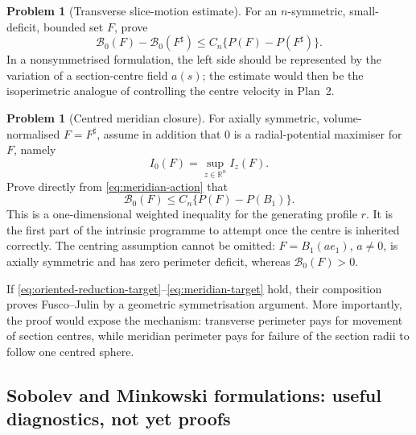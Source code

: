 \documentclass[11pt]{amsart}
\theoremstyle{definition}
\newtheorem{problem}[theorem]{Problem}
\newcommand{\R}{\mathbb R}
\newcommand{\Per}{P}
\begin{document}
\begin{problem}[Transverse slice-motion estimate]\label{prob:slice-motion}
For an \(n\)-symmetric, small-deficit, bounded set \(F\), prove
\[
   \mathcal B_0(F)-\mathcal B_0(F^\sharp)
      \le C_n\bigl\{\Per(F)-\Per(F^\sharp)\bigr\}.
\tag{6.8}\label{eq:slice-motion-target}
\]
In a nonsymmetrised formulation, the left side should be represented by
the variation of a section-centre field \(a(s)\); the estimate would
then be the isoperimetric analogue of controlling the centre velocity
in Plan~2.
\end{problem}

\begin{problem}[Centred meridian closure]\label{prob:meridian-closure}
For axially symmetric, volume-normalised \(F=F^\sharp\), assume in
addition that \(0\) is a radial-potential maximiser for \(F\), namely
\[
   I_0(F)=\sup_{z\in\R^n}I_z(F).
\]
Prove directly from \eqref{eq:meridian-action} that
\[
   \mathcal B_0(F)
      \le C_n\{\Per(F)-\Per(B_1)\}.
\tag{6.9}\label{eq:meridian-target}
\]
This is a one-dimensional weighted inequality for the generating
profile \(r\).  It is the first part of the intrinsic programme to
attempt once the centre is inherited correctly.  The centring
assumption cannot be omitted: \(F=B_1(ae_1)\), \(a\ne0\), is axially
symmetric and has zero perimeter deficit, whereas
\(\mathcal B_0(F)>0\).
\end{problem}

If \eqref{eq:oriented-reduction-target}--\eqref{eq:meridian-target}
hold, their composition proves Fusco--Julin by a geometric
symmetrisation argument.  More importantly, the proof would expose
the mechanism: transverse perimeter pays for movement of section
centres, while meridian perimeter pays for failure of the section
radii to follow one centred sphere.

\subsection{Sobolev and Minkowski formulations: useful diagnostics, not yet proofs}
\end{document}
